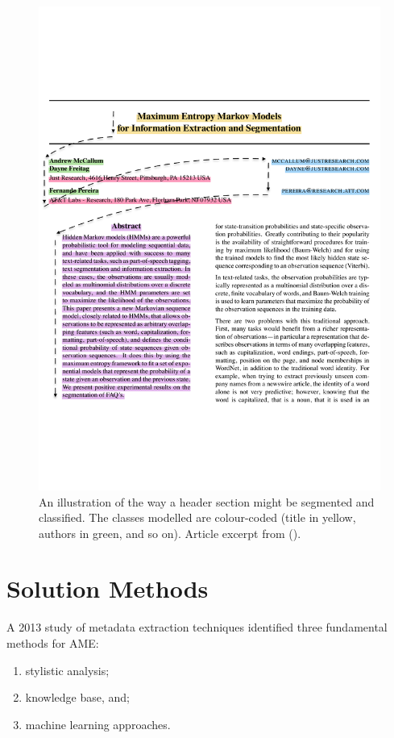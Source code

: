 \begin{figure}[!ht]
\center
\includegraphics[width=\textwidth]{Figures/extraction.pdf}
\caption{An illustration of the way a header section might be segmented and classified. The classes modelled are colour-coded (title in yellow, authors in green, and so on). Article excerpt from (\cite{mccallum2000maximum}).}
\label{fig:grobid}
\end{figure}

\section{Solution Methods}
\label{sec:solutionmethods}
A 2013 study of metadata extraction techniques \cite{lipinski2013evaluation} identified three fundamental methods for AME:

\begin{enumerate}
\item stylistic analysis;
\item knowledge base, and;
\item machine learning approaches.
\end{enumerate}

